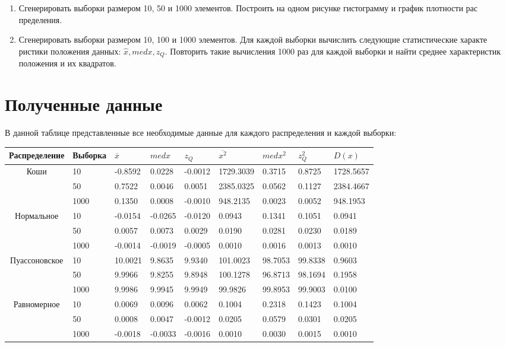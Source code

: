 \documentclass[12pt]{article}
\begin{document}
\begin{enumerate}
    \item  Сгенерировать выборки размером 10, 50 и 1000 элементов.
 Построить на одном рисунке гистограмму и график плотности рас
пределения.
    \item Сгенерировать выборки размером 10, 100 и 1000 элементов.
 Для каждой выборки вычислить следующие статистические характе ристики положения данных: $\hat{x}, med x, z_Q$. 
 Повторить такие вычисления 1000 раз для каждой выборки и найти среднее характеристик положения и их квадратов.
\end{enumerate}

\section{Полученные данные}
В данной таблице представленные все необходимые данные для каждого распределения и каждой выборки:\\
\begin{tabular}{|c|l|l|l|l|l|l|l|l|}
	\hline
	Распределение & Выборка & $\overline{x}$ & $med x$  & $z_Q$ & $\overline{x^2}$ & $med x^2$ & $z_Q^2$ & $D(x)$ \\
	\hline
	Коши & 10 & -0.8592 & 0.0228 & -0.0012 & 1729.3039 & 0.3715 & 0.8725 & 1728.5657 \\
	\hline
	   \ & 50 & 0.7522 & 0.0046 & 0.0051 & 2385.0325 & 0.0562 & 0.1127 & 2384.4667 \\
	\hline
	   \ & 1000 & 0.1350 & 0.0008 & -0.0010 & 948.2135 & 0.0023 & 0.0052 & 948.1953 \\
	\hline
		Нормальное & 10 & -0.0154 & -0.0265 & -0.0120 & 0.0943 & 0.1341 & 0.1051 & 0.0941 \\
	\hline
		\ & 50 & 0.0057 & 0.0073 & 0.0029 & 0.0190 & 0.0281 & 0.0230 & 0.0189 \\
	\hline
		\ & 1000 & -0.0014 & -0.0019 & -0.0005 & 0.0010 & 0.0016 & 0.0013 & 0.0010 \\
	\hline
		Пуассоновское & 10 & 10.0021 & 9.8635 & 9.9340 & 101.0023 & 98.7053 & 99.8338 & 0.9603 \\
	\hline
		\ & 50 & 9.9966 & 9.8255 & 9.8948 & 100.1278 & 96.8713 & 98.1694 & 0.1958 \\
	\hline
		\ & 1000 & 9.9986 & 9.9945 & 9.9949 & 99.9826 & 99.8953 & 99.9003 & 0.0100 \\
	\hline
		Равномерное & 10 & 0.0069 & 0.0096 & 0.0062 & 0.1004 & 0.2318 & 0.1423 & 0.1004 \\
	\hline
		\ & 50 & 0.0008 & 0.0047 & -0.0012 & 0.0205 & 0.0579 & 0.0301 & 0.0205 \\
	\hline
		\ & 1000 & -0.0018 & -0.0033 & -0.0016 & 0.0010 & 0.0030 & 0.0015 & 0.0010 \\
	\hline

\end{tabular}
\end{document}
